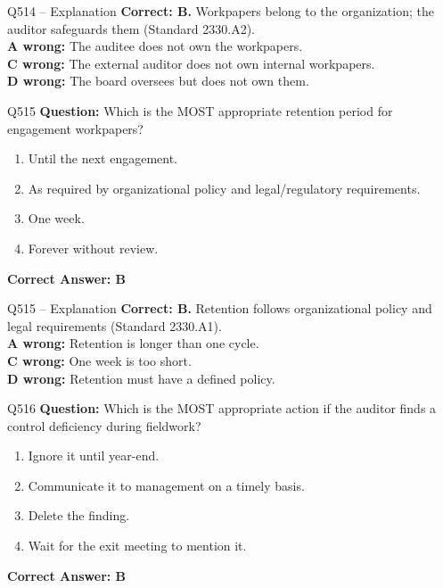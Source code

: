 \documentclass[aspectratio=169,10pt]{beamer}
\begin{document}
	\begin{frame}[t]{Q514 -- Explanation}
		\small
		\textbf{Correct: B.} Workpapers belong to the organization; the auditor safeguards them (Standard 2330.A2). \\[4pt]
		\textbf{A wrong:} The auditee does not own the workpapers. \\[2pt]
		\textbf{C wrong:} The external auditor does not own internal workpapers. \\[2pt]
		\textbf{D wrong:} The board oversees but does not own them.
	\end{frame}
	
	\begin{frame}[t]{Q515}
		\small
		\textbf{Question:} Which is the MOST appropriate retention period for engagement workpapers?
		\begin{enumerate}[label=\Alph*.,itemsep=1pt,topsep=2pt]
			\item Until the next engagement.
			\item As required by organizational policy and legal/regulatory requirements.
			\item One week.
			\item Forever without review.
		\end{enumerate}
		\vspace{4pt}
		\textbf{Correct Answer: B}
	\end{frame}
	
	\begin{frame}[t]{Q515 -- Explanation}
		\small
		\textbf{Correct: B.} Retention follows organizational policy and legal requirements (Standard 2330.A1). \\[4pt]
		\textbf{A wrong:} Retention is longer than one cycle. \\[2pt]
		\textbf{C wrong:} One week is too short. \\[2pt]
		\textbf{D wrong:} Retention must have a defined policy.
	\end{frame}
	
	\begin{frame}[t]{Q516}
		\small
		\textbf{Question:} Which is the MOST appropriate action if the auditor finds a control deficiency during fieldwork?
		\begin{enumerate}[label=\Alph*.,itemsep=1pt,topsep=2pt]
			\item Ignore it until year-end.
			\item Communicate it to management on a timely basis.
			\item Delete the finding.
			\item Wait for the exit meeting to mention it.
		\end{enumerate}
		\vspace{4pt}
		\textbf{Correct Answer: B}
	\end{frame}
	
\end{document}
